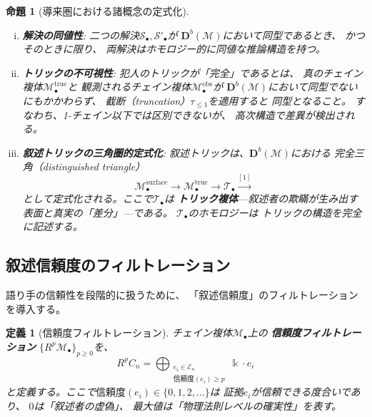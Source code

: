 \documentclass[12pt,twocolumn]{ltjsarticle}
\newtheorem{proposition}[theorem]{命題}
\newtheorem{definition}[theorem]{定義}
\newcommand{\Ev}{\mathcal{E}}
\newcommand{\Mys}{\mathcal{M}}
\newcommand{\Sol}{\mathcal{S}}
\newcommand{\kk}{\Bbbk}
\newcommand{\Db}{\mathbf{D}^b}
\begin{document}
\begin{proposition}[導来圏における諸概念の定式化]
\phantom{.}
\begin{enumerate}[(i)]
\item \textbf{解決の同値性}:
二つの解決$\Sol_\bullet, \Sol'_\bullet$が
$\Db(\Mys)$において同型であるとき、
かつそのときに限り、
両解決はホモロジー的に同値な推論構造を持つ。

\item \textbf{トリックの不可視性}:
犯人のトリックが「完全」であるとは、
真のチェイン複体$\Mys^{\mathrm{true}}_\bullet$と
観測されるチェイン複体$\Mys^{\mathrm{obs}}_\bullet$が
$\Db(\Mys)$において同型でないにもかかわらず、
截断（truncation）$\tau_{\leq 1}$を適用すると
同型となること。
すなわち、1-チェイン以下では区別できないが、
高次構造で差異が検出される。

\item \textbf{叙述トリックの三角圏的定式化}:
叙述トリックは、$\Db(\Mys)$における
\emph{完全三角}（distinguished triangle）
\begin{equation}
\Mys^{\mathrm{surface}}_\bullet \to
\Mys^{\mathrm{true}}_\bullet \to
\mathcal{T}_\bullet \xrightarrow{[1]}
\label{eq:narration_triangle}
\end{equation}
として定式化される。ここで$\mathcal{T}_\bullet$は
\textbf{トリック複体}---叙述者の欺瞞が生み出す
表面と真実の「差分」---である。
$\mathcal{T}_\bullet$のホモロジーは
トリックの構造を完全に記述する。
\end{enumerate}
\end{proposition}

\subsection{叙述信頼度のフィルトレーション}

語り手の信頼性を段階的に扱うために、
「叙述信頼度」のフィルトレーションを導入する。

\begin{definition}[信頼度フィルトレーション]
\label{def:reliability}
チェイン複体$\Mys_\bullet$上の
\textbf{信頼度フィルトレーション}
$\{R^p \Mys_\bullet\}_{p \geq 0}$を、
\begin{equation}
R^p C_n = \bigoplus_{\substack{e_i \in \Ev_n \\
\text{信頼度}(e_i) \geq p}} \kk \cdot e_i
\end{equation}
と定義する。ここで$\text{信頼度}(e_i) \in \{0, 1, 2, \ldots\}$は
証拠$e_i$が信頼できる度合いであり、
$0$は「叙述者の虚偽」、
最大値は「物理法則レベルの確実性」を表す。
\end{definition}
\end{document}
